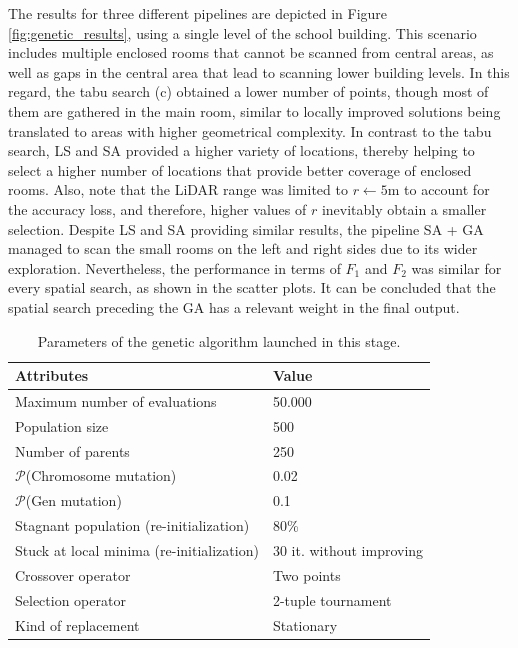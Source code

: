 The results for three different pipelines are depicted in Figure \ref{fig:genetic_results}, using a single level of the school building. This scenario includes multiple enclosed rooms that cannot be scanned from central areas, as well as gaps in the central area that lead to scanning lower building levels. In this regard, the tabu search (c) obtained a lower number of points, though most of them are gathered in the main room, similar to locally improved solutions being translated to areas with higher geometrical complexity. In contrast to the tabu search, LS and SA provided a higher variety of locations, thereby helping to select a higher number of locations that provide better coverage of enclosed rooms. Also, note that the LiDAR range was limited to $r \gets 5 \si{\meter}$ to account for the accuracy loss, and therefore, higher values of $r$ inevitably obtain a smaller selection. Despite LS and SA providing similar results, the pipeline SA + GA managed to scan the small rooms on the left and right sides due to its wider exploration. Nevertheless, the performance in terms of $F_1$ and $F_2$ was similar for every spatial search, as shown in the scatter plots. It can be concluded that the spatial search preceding the GA has a relevant weight in the final output.

\renewcommand{\arraystretch}{1.15}
\begin{table}
\caption{Parameters of the genetic algorithm launched in this stage.}
\label{table:genetic_algorithm_parameters}
\begin{tabular}{ll}
\toprule
\textbf{Attributes} & \textbf{Value}\\
\midrule
Maximum number of evaluations & 50.000\\
Population size & 500\\
Number of parents & 250\\
$\mathcal{P}$(Chromosome mutation) & 0.02\\
$\mathcal{P}$(Gen mutation) & 0.1\\
Stagnant population (re-initialization) & 80\%\\
Stuck at local minima (re-initialization) & 30 it. without improving\\
Crossover operator & Two points\\
Selection operator & 2-tuple tournament\\
Kind of replacement & Stationary\\
\bottomrule
\end{tabular}
\end{table}
\renewcommand{\arraystretch}{1}

